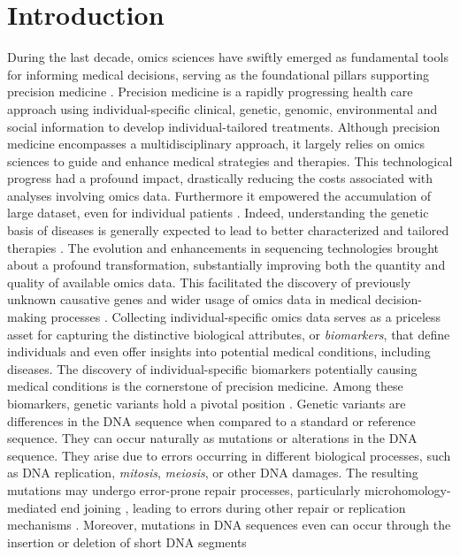 \documentclass[a4paper, titlepage, openright]{book}
\newcommand{\mychapter}[2]{
    \setcounter{chapter}{#1}
    \setcounter{section}{0}
    \chapter*{#2}
    \addcontentsline{toc}{chapter}{#2}
}
\begin{document}
\begin{frontespizio}
\end{frontespizio}
\tableofcontents
\listoffigures
\listoftables
\mychapter{1}{Introduction}
During the last decade, omics sciences have swiftly emerged as fundamental tools for informing medical decisions, serving as the foundational pillars supporting precision medicine \citep{ginsburg2009genomic}. Precision medicine is a rapidly progressing health care approach using individual-specific clinical, genetic, genomic, environmental and social information \citep{ginsburg2009genomic} to develop individual-tailored treatments. Although precision medicine encompasses a multidisciplinary approach, it largely relies on omics sciences to guide and enhance medical strategies and therapies. This technological progress had a profound impact, drastically reducing the costs associated with analyses involving omics data. Furthermore it empowered the accumulation of large dataset, even for individual patients \citep{voelkerding2009next}. Indeed, understanding the genetic basis of diseases is generally expected to lead to better characterized and tailored therapies \citep{ashley2016towards}. The evolution and enhancements in sequencing technologies brought about a profound transformation, substantially improving both the quantity and quality of available omics data. This facilitated the discovery of previously unknown causative genes \citep{ng2009targeted} and wider usage of omics data in medical decision-making processes \citep{ashley2010clinical, worthey2011making}. Collecting individual-specific omics data serves as a priceless asset for capturing the distinctive biological attributes, or \emph{biomarkers}, that define individuals and even offer insights into potential medical conditions, including diseases. The discovery of individual-specific biomarkers potentially causing medical conditions is the cornerstone of precision medicine. Among these biomarkers, genetic variants hold a pivotal position \citep{raphael2014identifying}. Genetic variants are differences in the DNA sequence when compared to a standard or reference sequence. They can occur naturally as mutations or alterations in the DNA sequence. They arise due to errors occurring in different biological processes, such as DNA replication, \emph{mitosis}, \emph{meiosis}, or other DNA damages. The resulting mutations may undergo error-prone repair processes, particularly microhomology-mediated end joining \citep{sinha2017microhomology, seol2018microhomology}, leading to errors during other repair or replication mechanisms \citep{rodgers2016error}. Moreover, mutations in DNA sequences even can occur through the insertion or deletion of short DNA segments 
\end{document}
